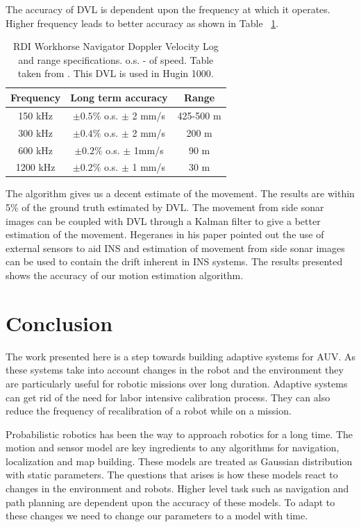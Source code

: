 \documentclass[12pt]{dalcsthesis}
\begin{document}
The accuracy of DVL is dependent upon the frequency at which it operates. Higher frequency leads to better accuracy as shown in Table ~\ref{tab-: DVL accuracy}.

\begin{table}
\centering
\label{tab-: DVL accuracy}
\begin{tabular}{|c|c|c|}
      \hline 
      Frequency  & Long term accuracy & Range\tabularnewline 
      \hline 
      150 kHz & $\pm0.5\%$ o.s. $\pm$ 2 mm/s & 425-500 m\tabularnewline
      \hline 
      300 kHz & $\pm0.4\%$ o.s. $\pm$ 2 mm/s & 200 m\tabularnewline 
      \hline 
      600 kHz & $\pm0.2\%$ o.s. $\pm$ 1mm/s & 90 m\tabularnewline 
      \hline 
      1200 kHz & $\pm 0.2\%$ o.s. $\pm$ 1 mm/s & 30 m\tabularnewline
      \hline 
\end{tabular}
\caption{RDI Workhorse Navigator Doppler Velocity Log and range specifications. o.s. - of speed. Table taken from \cite{Jalvinga}. This DVL is used in Hugin 1000.}
\end{table}       

The algorithm gives us a decent estimate of the movement. The results are within 5\% of the ground truth estimated by DVL. The movement from side sonar images can be coupled with DVL through a Kalman filter to give a better estimation of the movement. Hegeranes \cite{Hegrenæs2008} in his paper pointed out the use of external sensors to aid INS and estimation of movement from side sonar images can be used to contain the drift inherent in INS systems. 
The results presented shows the accuracy of our motion estimation algorithm.
\chapter{Conclusion}
The work presented here is a step towards building adaptive systems for AUV. As these systems take into account changes in the robot and the environment they are particularly useful for robotic missions over long duration. Adaptive systems can get rid of the need for labor intensive calibration process. They can also reduce the frequency of recalibration of a robot while on a mission. 

Probabilistic robotics has been the way to approach robotics for a long time. The motion and sensor model are key ingredients to any algorithms for navigation, localization and map building. These models are treated as Gaussian distribution with static parameters. The questions that arises is how these models react to changes in the environment and robots. Higher level task such as navigation and path planning are dependent upon the accuracy of these models. To adapt to these changes we need to change our parameters to a model with time.
\end{document}
